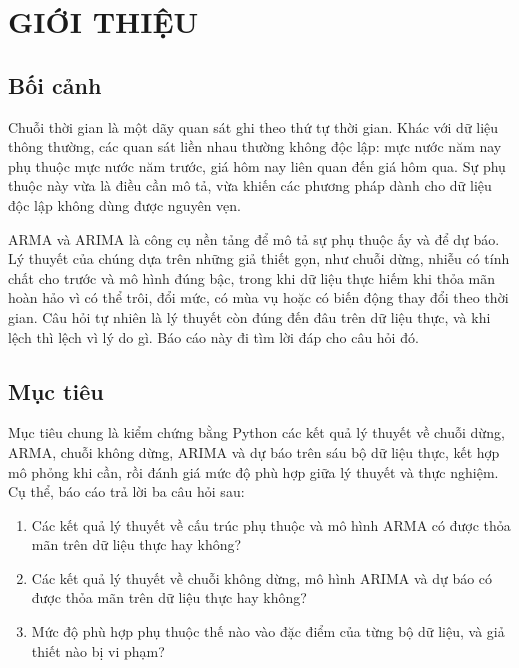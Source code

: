 \clearpage
\section[Giới thiệu]{GIỚI THIỆU}

\subsection{Bối cảnh}
Chuỗi thời gian là một dãy quan sát ghi theo thứ tự thời gian. Khác với dữ liệu thông thường, các quan sát liền nhau thường không độc lập: mực nước năm nay phụ thuộc mực nước năm trước, giá hôm nay liên quan đến giá hôm qua. Sự phụ thuộc này vừa là điều cần mô tả, vừa khiến các phương pháp dành cho dữ liệu độc lập không dùng được nguyên vẹn.

ARMA và ARIMA là công cụ nền tảng để mô tả sự phụ thuộc ấy và để dự báo. Lý thuyết của chúng dựa trên những giả thiết gọn, như chuỗi dừng, nhiễu có tính chất cho trước và mô hình đúng bậc, trong khi dữ liệu thực hiếm khi thỏa mãn hoàn hảo vì có thể trôi, đổi mức, có mùa vụ hoặc có biến động thay đổi theo thời gian. Câu hỏi tự nhiên là lý thuyết còn đúng đến đâu trên dữ liệu thực, và khi lệch thì lệch vì lý do gì. Báo cáo này đi tìm lời đáp cho câu hỏi đó.

\subsection{Mục tiêu}
Mục tiêu chung là kiểm chứng bằng Python các kết quả lý thuyết về chuỗi dừng, ARMA, chuỗi không dừng, ARIMA và dự báo trên sáu bộ dữ liệu thực, kết hợp mô phỏng khi cần, rồi đánh giá mức độ phù hợp giữa lý thuyết và thực nghiệm. Cụ thể, báo cáo trả lời ba câu hỏi sau:
\begin{enumerate}[label=\textbf{CH\arabic*.}]
	\item Các kết quả lý thuyết về cấu trúc phụ thuộc và mô hình ARMA có được thỏa mãn trên dữ liệu thực hay không?
	\item Các kết quả lý thuyết về chuỗi không dừng, mô hình ARIMA và dự báo có được thỏa mãn trên dữ liệu thực hay không?
	\item Mức độ phù hợp phụ thuộc thế nào vào đặc điểm của từng bộ dữ liệu, và giả thiết nào bị vi phạm?
\end{enumerate}

